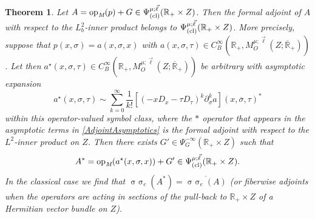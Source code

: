 \documentclass[reqno]{amsart}
\numberwithin{equation}{section}
\newtheorem{theorem}[equation]{Theorem}
\theoremstyle{definition}
\def\R{\mathbb R}
\def\opm{\textup{op}_{\textit{M}}}
\DeclareMathOperator{\sym}{ \sigma\!\!\!\sigma}
\begin{document}
\begin{theorem}\label{AdjointsCalculus}
Let $A = \opm(p) + G \in \Psi^{\mu;\vec{\ell}}_{\textup{(cl)}}(\R_+\times Z)$. Then the formal adjoint of $A$ with respect to the $L^2_b$-inner product belongs to $\Psi^{\mu;\vec{\ell}}_{\textup{(cl)}}(\R_+\times Z)$. More precisely, suppose that $p(x,\sigma) = a(x,\sigma,x)$ with $a(x,\sigma,\tau) \in C^{\infty}_B(\R_+,M^{\mu;\vec{\ell}}_O(Z;\overline{\R}_+))$. Let then $a^{\star}(x,\sigma,\tau)  \in C^{\infty}_B(\R_+,M^{\mu;\vec{\ell}}_O(Z;\overline{\R}_+))$ be arbitrary with asymptotic expansion
\begin{equation}\label{AdjointAsymptotics}
a^{\star}(x,\sigma,\tau) \sim \sum\limits_{k=0}^{\infty}\frac{1}{k!}[(-xD_x - \tau D_{\tau})^k\partial_{\sigma}^k a](x,\overline{\sigma},\tau)^*
\end{equation}
within this operator-valued symbol class, where the $*$ operator that appears in the asymptotic terms in \eqref{AdjointAsymptotics} is the formal adjoint with respect to the $L^2$-inner product on $Z$. Then there exists $G' \in \Psi^{-\infty}_G(\R_+\times Z)$ such that
$$
A^* = \opm(a^{\star}(x,\sigma,x) ) + G' \in \Psi^{\mu;\vec{\ell}}_{\textup{(cl)}}(\R_+\times Z).
$$
In the classical case we find that $\sym_e(A^*) = \overline{\sym_e(A)}$ (or fiberwise adjoints when the operators are acting in sections of the pull-back to $\R_+\times Z$ of a Hermitian vector bundle on $Z$).
\end{theorem}
\end{document}
